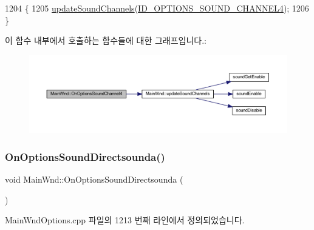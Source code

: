 \begin{DoxyCode}
1204 \{
1205   \mbox{\hyperlink{class_main_wnd_a30b67d9db53d79122684a81e549ebd1c}{updateSoundChannels}}(\mbox{\hyperlink{resource_8h_a2bbf6668c3d516efbd37911405a727e4}{ID\_OPTIONS\_SOUND\_CHANNEL4}});
1206 \}
\end{DoxyCode}
이 함수 내부에서 호출하는 함수들에 대한 그래프입니다.\+:
\nopagebreak
\begin{figure}[H]
\begin{center}
\leavevmode
\includegraphics[width=350pt]{class_main_wnd_a1c6886c26731e96cff8cd50c16c42101_cgraph}
\end{center}
\end{figure}
\mbox{\label{class_main_wnd_adf862907e5764ee38c51cdd192dc5bae}} 
\subsubsection{\texorpdfstring{On\+Options\+Sound\+Directsounda()}{OnOptionsSoundDirectsounda()}}
{\footnotesize\ttfamily void Main\+Wnd\+::\+On\+Options\+Sound\+Directsounda (\begin{DoxyParamCaption}{ }\end{DoxyParamCaption})\hspace{0.3cm}{\ttfamily [protected]}}



Main\+Wnd\+Options.\+cpp 파일의 1213 번째 라인에서 정의되었습니다.


